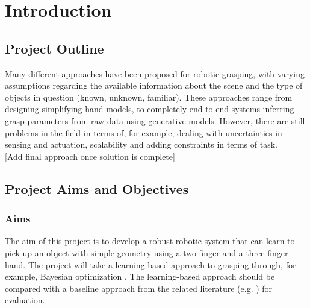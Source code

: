 \documentclass[a4paper]{report}
\begin{document}
\chapter{Introduction}
\label{chap:1}

\section{Project Outline}
\label{sec:1.1}
Many different approaches have been proposed for robotic grasping, with varying assumptions regarding the available information about the scene and the type of objects in question (known, unknown, familiar). These approaches range from designing simplifying hand models, to completely end-to-end systems inferring grasp parameters from raw data using generative models. However, there are still problems in the field in terms of, for example, dealing with uncertainties in sensing and actuation, scalability and adding constraints in terms of task.\\

[Add final approach once solution is complete]


\section{Project Aims and Objectives}
\label{sec:1.2}

\subsection{Aims}
\label{sec:1.2.1}
The aim of this project is to develop a robust robotic system that can learn to pick up an object with simple geometry using a two-finger and a three-finger hand. The project will take a learning-based approach to grasping through, for example, Bayesian optimization \cite{nogueria, frazier}. The learning-based approach should be compared with a baseline approach from the related literature (e.g. \cite{nogueria, danielczuk, breyer}) for evaluation. 
\end{document}
